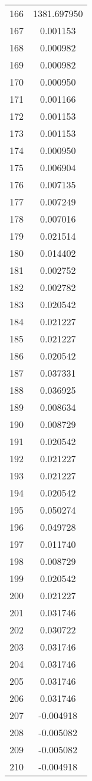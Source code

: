 \documentclass[12pt]{article}
\begin{document}
\begin{longtable}{@{}cc@{}}
166 & 1381.697950 \\
167 & 0.001153 \\
168 & 0.000982 \\
169 & 0.000982 \\
170 & 0.000950 \\
171 & 0.001166 \\
172 & 0.001153 \\
173 & 0.001153 \\
174 & 0.000950 \\
175 & 0.006904 \\
176 & 0.007135 \\
177 & 0.007249 \\
178 & 0.007016 \\
179 & 0.021514 \\
180 & 0.014402 \\
181 & 0.002752 \\
182 & 0.002782 \\
183 & 0.020542 \\
184 & 0.021227 \\
185 & 0.021227 \\
186 & 0.020542 \\
187 & 0.037331 \\
188 & 0.036925 \\
189 & 0.008634 \\
190 & 0.008729 \\
191 & 0.020542 \\
192 & 0.021227 \\
193 & 0.021227 \\
194 & 0.020542 \\
195 & 0.050274 \\
196 & 0.049728 \\
197 & 0.011740 \\
198 & 0.008729 \\
199 & 0.020542 \\
200 & 0.021227 \\
201 & 0.031746 \\
202 & 0.030722 \\
203 & 0.031746 \\
204 & 0.031746 \\
205 & 0.031746 \\
206 & 0.031746 \\
207 & -0.004918 \\
208 & -0.005082 \\
209 & -0.005082 \\
210 & -0.004918 \\

\end{longtable}
\end{document}
